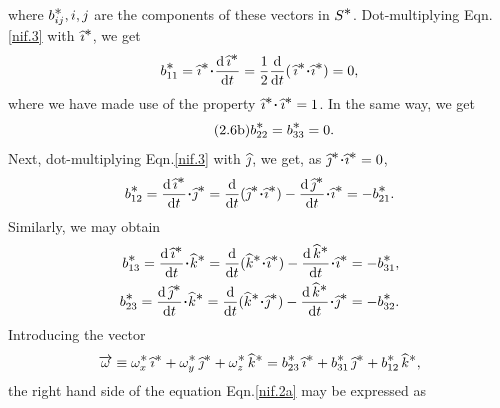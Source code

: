 where $ b^{{\textstyle \ast}}_{ij}, i,j $ are 
the components of these vectors in $S^{{\textstyle \ast}}$. 
Dot-multiplying Eqn.\eqref{nif.3} with 
${\widehat{\imath}}^{{\textstyle \ast}}$, we get
\begin{align}\label{nif.4}
b^{\bst}_{11}=\eye^{\bst}\dotp 
\dv{\,\eye^{\bst}}{t}=\frac{1}{2}
\dv{}{t} (\,\eye^{\bst} \dotp \eye^{\bst})=0,
\end{align}
where we have made use of the property
$\eye^{\bst}\dotp\,\eye^{\bst}=1 $. In the same way, we get
\begin{align}\tag{2.6b}
b^{{\textstyle \ast}}_{22}=b^{{\textstyle \ast}}_{33}=0.
\end{align}
Next, dot-multiplying Eqn.\eqref{nif.3} with ${\widehat{\jmath}} $, we
get, as $\jay^{\bst} \dotp \eye^{\bst}=0$,
\begin{align}\label{nif.5}
b^{\bst}_{12}=\dv{\,\eye^{\bst}}{t} \dotp\jay^{\bst}
= \dv{}{t} (\jay^ {\bst}\dotp\eye^{\bst})
-\dv{\,\jay^{\bst}}{t}\dotp\eye^{\bst} =-b^{\bst}_{21}.
\end{align}
Similarly, we may obtain
\begin{align}
b^{\bst}_{13}=\dv{ \,\eye^{\bst}}{t}\dotp\kay^{\bst}
=\dv{}{t} (\kay^{\bst} \dotp\eye^{\bst})
-\dv{\,\kay^{\bst}}{t}\dotp\eye^{\bst}
=-b^{\bst}_{31},\label{nif.5a}\\
b^{\bst}_{23}=\dv{\,\jay^{\bst}}{t}
\dotp\kay^{\bst}=\dv{}{t} (\kay^{\bst}
\dotp\jay^{\bst})
 -\dv{\,\kay^{\bst}}{t} \dotp
\jay^{\bst}=-b^{\bst}_{32}.\label{nif.5b}
\end{align}
Introducing the vector
\begin{align}\label{nif.6}
\overrightarrow{{\omega}}\equiv{\omega}^{{\textstyle \ast}}_x\,{\widehat{\imath}}^{{\textstyle \ast}}
+{\omega}^{{\textstyle \ast}}_y\,{\widehat{\jmath}}^{{\textstyle \ast}}+{\omega}^{{\textstyle \ast}}_z \,{\widehat{k}}^{ {\textstyle \ast} }
= b^{{\textstyle \ast}}_{23}\,{\widehat{\imath}}^{{\textstyle \ast}} + b^{{\textstyle \ast}}_{31 } \,{\widehat{\jmath}}^{{\textstyle \ast}}
+b^{{\textstyle \ast}}_{12}\,{\widehat{k}}^{{\textstyle \ast}},
\end{align}
the right hand side of the equation Eqn.\eqref{nif.2a} may 
be expressed as

